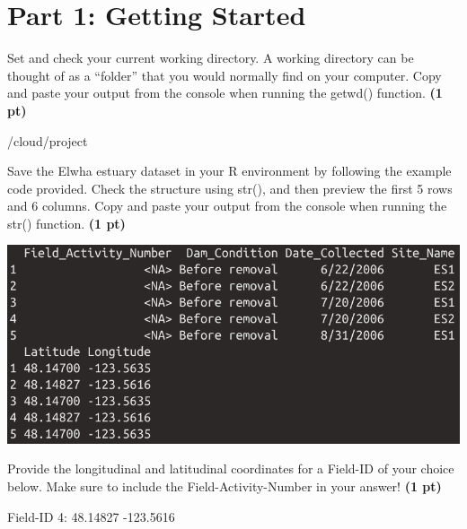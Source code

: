 \documentclass[12pt,letterpaper]{article}
\begin{document}
\section*{Part 1: Getting Started}
\begin{enumerate}[font=\bfseries, wide]
    {\color{gray}\item Set and check your current working directory. A working directory can be thought of as a “folder” that you would normally find on your computer. Copy and paste your output from the console when running the getwd() function. \textbf{(1 pt)}}\par
    
    /cloud/project

    {\color{gray}\item Save the Elwha estuary dataset in your R environment by following the example code provided. Check the structure using str(), and then preview the first 5 rows and 6 columns. Copy and paste your output from the console when running the str() function. \textbf{(1 pt)}}
    \begin{center}
        \includegraphics[scale=0.35]{images/a2-qst2.png}
    \end{center}

    {\color{gray}\item Provide the longitudinal and latitudinal coordinates for a Field-ID of your choice below. Make sure to include the Field-Activity-Number in your answer! \textbf{(1 pt)}}\par

    Field-ID 4: 48.14827 -123.5616
\end{enumerate}
\end{document}
